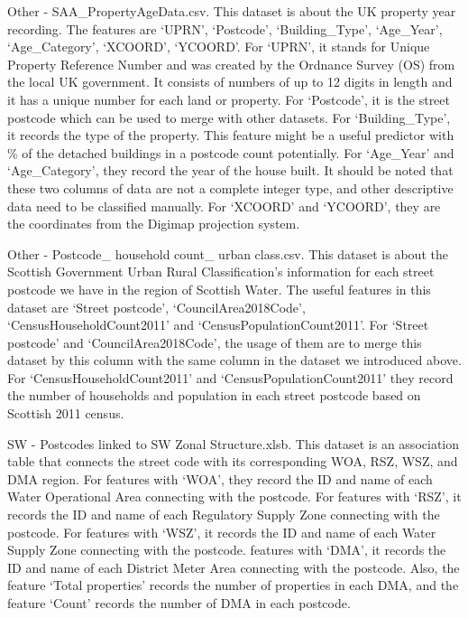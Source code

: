\documentclass[11pt,twoside]{article}
\numberwithin{Theorem}{section}
\numberwithin{Definition}{section}
\numberwithin{Lemma}{section}
\numberwithin{Algorithm}{section}
\numberwithin{equation}{section}
\begin{document}
\begin{enumerate}
Other - SAA\_PropertyAgeData.csv. This dataset is about the UK property year recording. The features are ‘UPRN’, ‘Postcode’, ‘Building\_Type’, ‘Age\_Year’, ‘Age\_Category’, ‘XCOORD’, ‘YCOORD’. For ‘UPRN’, it stands for Unique Property Reference Number and was created by the Ordnance Survey (OS) from the local UK government. It consists of numbers of up to 12 digits in length and it has a unique number for each land or property. For ‘Postcode’, it is the street postcode which can be used to merge with other datasets. For ‘Building\_Type’, it records the type of the property. This feature might be a useful predictor with \% of the detached buildings in a postcode count potentially. For ‘Age\_Year’ and ‘Age\_Category’, they record the year of the house built. It should be noted that these two columns of data are not a complete integer type, and other descriptive data need to be classified manually. For ‘XCOORD’ and ‘YCOORD’, they are the coordinates from the Digimap projection system.

Other - Postcode\_ household count\_ urban class.csv. This dataset is about the Scottish Government Urban Rural Classification’s information for each street postcode we have in the region of Scottish Water. The useful features in this dataset are ‘Street postcode’, ‘CouncilArea2018Code’, ‘CensusHouseholdCount2011’ and ‘CensusPopulationCount2011’. For ‘Street postcode’ and ‘CouncilArea2018Code’, the usage of them are to merge this dataset by this column with the same column in the dataset we introduced above. For ‘CensusHouseholdCount2011’ and ‘CensusPopulationCount2011’ they record the number of households and population in each street postcode based on Scottish 2011 census.

SW - Postcodes linked to SW Zonal Structure.xlsb. This dataset is an association table that connects the street code with its corresponding WOA, RSZ, WSZ, and DMA region. For features with ‘WOA’, they record the ID and name of each Water Operational Area connecting with the postcode. For features with ‘RSZ’, it records the ID and name of each Regulatory Supply Zone connecting with the postcode. For features with ‘WSZ’, it records the ID and name of each Water Supply Zone connecting with the postcode. features with ‘DMA’, it records the ID and name of each District Meter Area connecting with the postcode. Also, the feature ‘Total properties’ records the number of properties in each DMA, and the feature ‘Count’ records the number of DMA in each postcode.

\end{enumerate}
\end{document}
